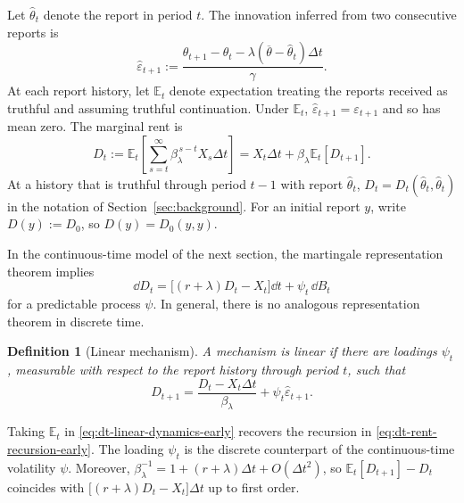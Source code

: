 \documentclass[12pt]{article}
\newtheorem{definition}{Definition}
\newcommand{\E}{\mathbb{E}}
\newcommand{\hth}{\hat\theta}
\begin{document}
Let \(\hth_t\) denote the report in period \(t\). The innovation
inferred from two consecutive reports is
\begin{equation}\label{eq:dt-innovation-early}
  \hat\varepsilon_{t+1}
  :=
  \frac{
    \hth_{t+1}-\hth_t
    -\lambda(\overline\theta-\hth_t)\Delta t
  }{\gamma}.
\end{equation}
At each report history, let \(\E_t\) denote expectation treating the
reports received as truthful and assuming truthful continuation. Under
\(\E_t\), \(\hat\varepsilon_{t+1}=\varepsilon_{t+1}\) and so has mean zero. The marginal rent is
\begin{equation}\label{eq:dt-rent-recursion-early}
  D_t
  :=
  \E_t\left[
    \sum_{s=t}^{\infty}
    \beta_\lambda^{\,s-t}X_s\Delta t
  \right]
  =
  X_t\Delta t+\beta_\lambda\E_t[D_{t+1}].
\end{equation}
At a history that is
truthful through period \(t-1\) with report \(\hth_t\),
\(D_t=D_t(\hth_t,\hth_t)\) in the notation of
Section~\ref{sec:background}. For an initial report \(y\), write
\(D(y):=D_0\), so \(D(y)=D_0(y,y)\).

In the continuous-time
model of the next section, the martingale representation theorem
implies
\begin{equation}\label{eq:dt-rent-sde-early}
  \dd D_t
  =
  \bigl[(r+\lambda)D_t-X_t\bigr]\dd t
  +\psi_t\,\dd B_t
\end{equation}
for a predictable process \(\psi\). In general, there is no analogous representation theorem in discrete time.


\begin{definition}[Linear mechanism]\label{def:linear-contract-early}
A mechanism is \emph{linear}
if there are loadings \(\psi_t\), measurable with respect to the report
history through period \(t\), such that
\begin{equation}\label{eq:dt-linear-dynamics-early}
  D_{t+1}
  =
  \frac{D_t-X_t\Delta t}{\beta_\lambda}
  +\psi_t\hat\varepsilon_{t+1}.
\end{equation}
\end{definition}

Taking \(\E_t\) in \eqref{eq:dt-linear-dynamics-early} recovers the
recursion in \eqref{eq:dt-rent-recursion-early}. The loading \(\psi_t\) is the
discrete counterpart of the continuous-time volatility \(\psi\). Moreover,
\(\beta_\lambda^{-1}=1+(r+\lambda)\Delta t+O(\Delta t^2)\), so
\(\E_t[D_{t+1}]-D_t\) coincides with
\(\bigl[(r+\lambda)D_t-X_t\bigr]\Delta t\) up to first order.
\end{document}
